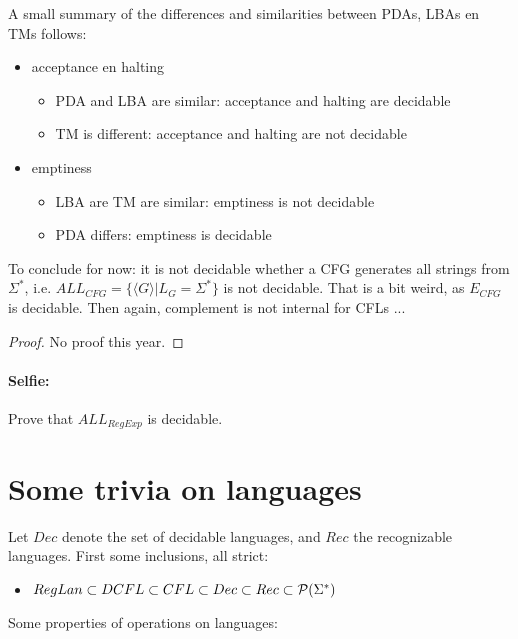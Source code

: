A small summary of the differences and similarities between PDAs, LBAs
en TMs follows:

\begin{itemize}
\item acceptance en halting
\begin{itemize}
\item PDA and LBA are similar: acceptance and halting are decidable
\item TM is different: acceptance and halting are not decidable
\end{itemize}
\item emptiness
\begin{itemize}
\item LBA are TM are similar: emptiness is not decidable
\item PDA differs: emptiness is decidable
\end{itemize}
\end{itemize}

To conclude for now: it is not decidable whether a CFG generates all
strings from $\Sigma^*$, i.e. $ALL_{CFG} = \{\langle G \rangle|L_G =
\Sigma^*\}$ is not decidable. That is a bit weird, as $E_{CFG}$ is
decidable. Then again, complement is not internal for CFLs ...

\begin{proof}
No proof this year.
\end{proof}


\paragraph{Selfie:} Prove that $ALL_{RegExp}$ is decidable.

\section{Some trivia on languages}

Let $Dec$ denote the set of decidable languages, and $Rec$ the
recognizable languages. First some inclusions, all strict:

\begin{itemize}
\item[] $RegLan \subset DCFL \subset CFL \subset Dec \subset Rec
\subset {\cal P}(\Sigma^*)$
\end{itemize}

Some properties of operations on languages:

